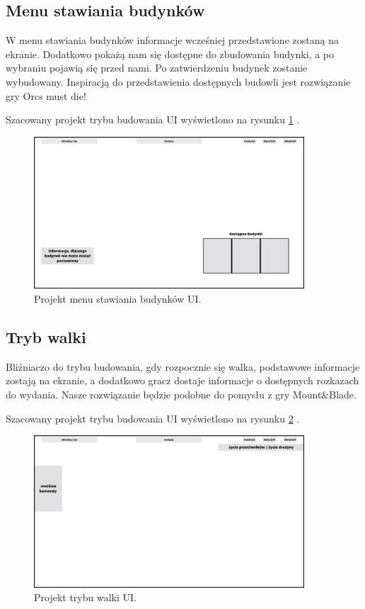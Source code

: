 \subsection{Menu stawiania budynków}
 W menu stawiania budynków informacje wcześniej przedstawione zostaną na ekranie. Dodatkowo pokażą nam się dostępne do zbudowania budynki, a po wybraniu pojawią się przed nami. Po zatwierdzeniu budynek zostanie wybudowany.
	Inspiracją do przedstawienia dostępnych budowli jest rozwiązanie gry Orcs must die!


    Szacowany projekt trybu budowania UI wyświetlono na rysunku \ref{fig:ui_bud} .
    \begin{figure}[htbp]
        \centering
        \includegraphics[width=0.9\textwidth]{images/ui/ui_proj_budowanie.jpg}
        \caption{Projekt menu stawiania budynków UI.
        }\label{fig:ui_bud}
    \end{figure}


\subsection{Tryb walki}
Bliźniaczo do trybu budowania, gdy rozpocznie się walka, podstawowe informacje zostają na ekranie, a dodatkowo gracz dostaje informacje o dostępnych rozkazach do wydania. Nasze rozwiązanie będzie podobne do pomysłu z gry Mount\&Blade.

Szacowany projekt trybu budowania UI wyświetlono na rysunku \ref{fig:ui_wal} .
    \begin{figure}[htbp]
        \centering
        \includegraphics[width=0.9\textwidth]{images/ui/ui_proj_walka.jpg}
        \caption{Projekt trybu walki UI.
        }\label{fig:ui_wal}
    \end{figure}
